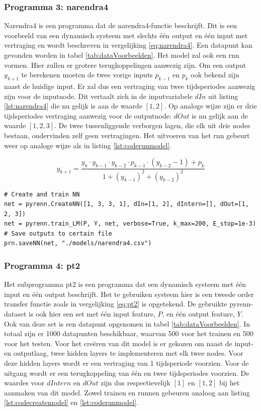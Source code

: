		\subsubsection{Programma 3: narendra4}
		Narendra4 is een programma dat de narendra4-functie\cite{narendra4} beschrijft. Dit is een voorbeeld van een dynamisch systeem met slechts \'e\'en output en \'e\'en input met vertraging en wordt beschreven in vergelijking \ref{eq:narendra4}. Een datapunt kan gevonden worden in tabel \ref{tab:dataVoorbeelden}. Het model zal ook een \gls{rnn} vormen. Hier zullen er grotere terugkoppelingen aanwezig zijn. Om een output $y_{k+1}$ te berekenen moeten de twee vorige inputs $p_{k-1}$ en $p_{k}$ ook bekend zijn naast de huidige input. Er zal dus een vertraging van twee tijdsperiodes aanwezig zijn voor de inputnode. Dit vertaalt zich in de inputvariabele $dIn$ uit listing \ref{lst:narendra4} die nu gelijk is aan de waarde $[1,2]$. Op analoge wijze zijn er drie tijdsperiodes vertraging aanwezig voor de outputnode: $dOut$ is nu gelijk aan de waarde $[1,2,3]$. De twee tussenliggende verborgen lagen, die elk uit drie nodes bestaan, ondervinden zelf geen vertragingen. Het uitvoeren van het \gls{rnn} gebeurt weer op analoge wijze als in listing \ref{lst:coderunmodel}.
		
		\begin{equation}\label{eq:narendra4}
			y_{k+1} =\frac{ y_k \cdot y_{k-1} \cdot y_{k-2}\cdot p_{k-1}\cdot(y_{k-2}-1	)+ p_k} {1+(y_{k-1})^2+(y_{k-2})^2}	
		\end{equation}
		
		\begin{lstlisting}[caption={Cre\"eren en trainen van pyrenn-model voor narendra4.}, captionpos=b,label={lst:narendra4}]
# Create and train NN
net = pyrenn.CreateNN([1, 3, 3, 1], dIn=[1, 2], dIntern=[], dOut=[1, 2, 3])
net = pyrenn.train_LM(P, Y, net, verbose=True, k_max=200, E_stop=1e-3)
# Save outputs to certain file
prn.saveNN(net, "./models/narendra4.csv")
\end{lstlisting}
		
		\subsubsection{Programma 4: pt2}
		Het subprogramma pt2 is een programma dat een dynamisch systeem met \'e\'en input en \'e\'en output beschrijft. Het te gebruiken systeem hier is een tweede order transfer functie zoals in vergelijking \ref{eq:pt2} is opgetekend. De gebruikte pyrenn-dataset is ook hier een set met \'e\'en input feature, $P$, en \'e\'en output feature, $Y$. Ook van deze set is een datapunt opgenomen in tabel \ref{tab:dataVoorbeelden}. In totaal zijn er 1000 datapunten beschikbaar, waarvan 500 voor het trainen en 500 voor het testen. Voor het cre\"eren van dit model is er gekozen om naast de input- en outputlaag, twee hidden layers te implementeren met elk twee nodes. Voor deze hidden layers wordt er een vertraging van 1 tijdsperiode voorzien. Voor de uitgang wordt er een terugkoppeling van \'e\'en en twee tijdsperiodes voorzien. De waardes voor $dIntern$ en $dOut$ zijn dus respectievelijk $[1]$ en $[1,2]$ bij het aanmaken van dit model. Zowel trainen en runnen gebeuren analoog aan listing  \ref{lst:codecreatemodel} en \ref{lst:coderunmodel}.
		
